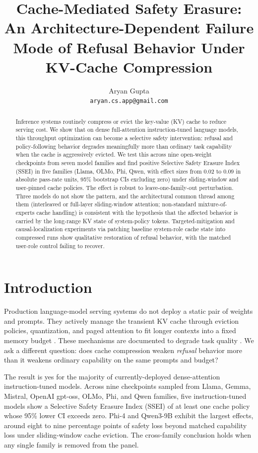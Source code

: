 \documentclass[11pt]{article}
\title{Cache-Mediated Safety Erasure:\\
An Architecture-Dependent Failure Mode of Refusal Behavior Under KV-Cache Compression}
\author{
  Aryan Gupta\\
  \texttt{aryan.cs.app@gmail.com}
}
\date{}
\begin{document}
\maketitle

\begin{abstract}
Inference systems routinely compress or evict the key-value (KV) cache to reduce serving cost. We show that on dense full-attention instruction-tuned language models, this throughput optimization can become a selective safety intervention: refusal and policy-following behavior degrades meaningfully more than ordinary task capability when the cache is aggressively evicted. We test this across nine open-weight checkpoints from seven model families and find positive Selective Safety Erasure Index (SSEI) in five families (Llama, OLMo, Phi, Qwen, with effect sizes from 0.02 to 0.09 in absolute pass-rate units, 95\% bootstrap CIs excluding zero) under sliding-window and user-pinned cache policies. The effect is robust to leave-one-family-out perturbation. Three models do not show the pattern, and the architectural common thread among them (interleaved or full-layer sliding-window attention; non-standard mixture-of-experts cache handling) is consistent with the hypothesis that the affected behavior is carried by the long-range KV state of system-policy tokens. Targeted-mitigation and causal-localization experiments via patching baseline system-role cache state into compressed runs show qualitative restoration of refusal behavior, with the matched user-role control failing to recover.
\end{abstract}

\section{Introduction}

Production language-model serving systems do not deploy a static pair of weights and prompts. They actively manage the transient KV cache through eviction policies, quantization, and paged attention to fit longer contexts into a fixed memory budget \citep{kwon2023pagedattention,zhang2023h2o,xiao2024streamingllm}. These mechanisms are documented to degrade task quality \citep{chen2025pitfalls,yang2024notoken,ananthanarayanan2026physics}. We ask a different question: does cache compression weaken \emph{refusal} behavior more than it weakens ordinary capability on the same prompts and budget?

The result is yes for the majority of currently-deployed dense-attention instruction-tuned models. Across nine checkpoints sampled from Llama, Gemma, Mistral, OpenAI gpt-oss, OLMo, Phi, and Qwen families, five instruction-tuned models show a Selective Safety Erasure Index (SSEI) of at least one cache policy whose 95\% lower CI exceeds zero. Phi-4 and Qwen3-9B exhibit the largest effects, around eight to nine percentage points of safety loss beyond matched capability loss under sliding-window cache eviction. The cross-family conclusion holds when any single family is removed from the panel.
\end{document}
